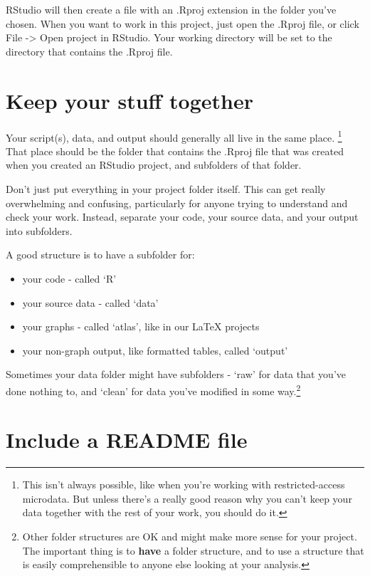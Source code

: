 \documentclass[]{book}
\providecommand{\tightlist}{%
  \setlength{\itemsep}{0pt}\setlength{\parskip}{0pt}}
\let\rmarkdownfootnote\footnote%
\def\footnote{\protect\rmarkdownfootnote}
\begin{document}
RStudio will then create a file with an .Rproj extension in the folder you've chosen. When you want to work in this project, just open the .Rproj file, or click File -\textgreater{} Open project in RStudio. Your working directory will be set to the directory that contains the .Rproj file.

\hypertarget{keep-your-stuff-together}{%
\section{Keep your stuff together}\label{keep-your-stuff-together}}

Your script(s), data, and output should generally all live in the same place. \footnote{This isn't always possible, like when you're working with restricted-access microdata. But unless there's a really good reason why you can't keep your data together with the rest of your work, you should do it.} That place should be the folder that contains the .Rproj file that was created when you created an RStudio project, and subfolders of that folder.

Don't just put everything in your project folder itself. This can get really overwhelming and confusing, particularly for anyone trying to understand and check your work. Instead, separate your code, your source data, and your output into subfolders.

A good structure is to have a subfolder for:

\begin{itemize}
\tightlist
\item
  your code - called `R'
\item
  your source data - called `data'
\item
  your graphs - called `atlas', like in our LaTeX projects
\item
  your non-graph output, like formatted tables, called `output'
\end{itemize}

Sometimes your data folder might have subfolders - `raw' for data that you've done nothing to, and `clean' for data you've modified in some way.\footnote{Other folder structures are OK and might make more sense for your project. The important thing is to \textbf{have} a folder structure, and to use a structure that is easily comprehensible to anyone else looking at your analysis.}

\hypertarget{README}{%
\section{Include a README file}\label{README}}
\end{document}

